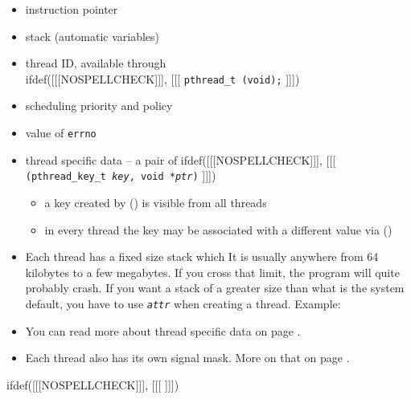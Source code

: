 \begin{slide}
\begin{itemize}
\item instruction pointer
\item stack (automatic variables)
\item thread ID, available through\\
ifdef([[[NOSPELLCHECK]]], [[[
\texttt{pthread\_t (void);}
]]])
\item scheduling priority and policy
\item value of \texttt{errno}
\item thread specific data -- a pair of
ifdef([[[NOSPELLCHECK]]], [[[
\texttt{(pthread\_key\_t \emph{key}, void *\emph{ptr})} 
]]])
    \begin{itemize}
    \item a key created by () is visible from all
    threads
    \item in every thread the key may be associated with a different value via
    ()
    \end{itemize}
\end{itemize}
\end{slide}

\begin{itemize}
\item Each thread has a fixed size stack which   It is usually anywhere from 64 kilobytes to a few megabytes.  If you
cross that limit, the program will quite probably crash.  If you want a stack of
a greater size than what is the system default, you have to use
\emph{\texttt{attr}} when creating a thread.
Example: 
\item You can read more about thread specific data on page
\pageref{THREAD_SPECIFIC_DATA}.
\item Each thread also has its own signal mask.  More on that on page
\pageref{PTHREADSIGMASK}.
\end{itemize}


ifdef([[[NOSPELLCHECK]]], [[[
]]])


